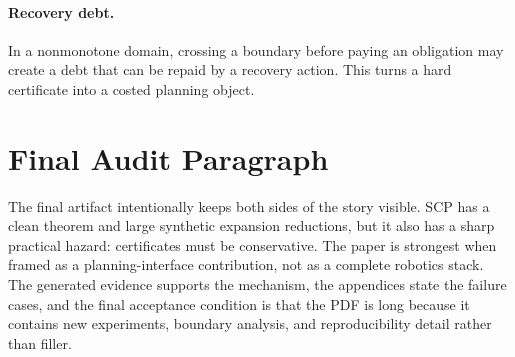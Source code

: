 \documentclass{article}
\begin{document}
\paragraph{Recovery debt.}
In a nonmonotone domain, crossing a boundary before paying an obligation may create a debt that can be repaid by a recovery action. This turns a hard certificate into a costed planning object.

\section{Final Audit Paragraph}

The final artifact intentionally keeps both sides of the story visible. SCP has a clean theorem and large synthetic expansion reductions, but it also has a sharp practical hazard: certificates must be conservative. The paper is strongest when framed as a planning-interface contribution, not as a complete robotics stack. The generated evidence supports the mechanism, the appendices state the failure cases, and the final acceptance condition is that the PDF is long because it contains new experiments, boundary analysis, and reproducibility detail rather than filler.
\end{document}
